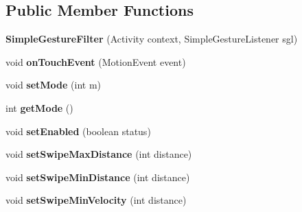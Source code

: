 \subsection*{Public Member Functions}
\begin{DoxyCompactItemize}
\item 
\hypertarget{classcom_1_1chopin_1_1SimpleGestureFilter_af3ce91f83615f801a7a5a4d4992ca9b0}{}{\bfseries Simple\+Gesture\+Filter} (Activity context, Simple\+Gesture\+Listener sgl)\label{classcom_1_1chopin_1_1SimpleGestureFilter_af3ce91f83615f801a7a5a4d4992ca9b0}

\item 
\hypertarget{classcom_1_1chopin_1_1SimpleGestureFilter_aa0f6b80bd7046a78170aa4ef7e1d6f4d}{}void {\bfseries on\+Touch\+Event} (Motion\+Event event)\label{classcom_1_1chopin_1_1SimpleGestureFilter_aa0f6b80bd7046a78170aa4ef7e1d6f4d}

\item 
\hypertarget{classcom_1_1chopin_1_1SimpleGestureFilter_a93214a56e0e5083e21374a4ea679d86a}{}void {\bfseries set\+Mode} (int m)\label{classcom_1_1chopin_1_1SimpleGestureFilter_a93214a56e0e5083e21374a4ea679d86a}

\item 
\hypertarget{classcom_1_1chopin_1_1SimpleGestureFilter_a07c13f2f34e3b08451db07b266ab2d8e}{}int {\bfseries get\+Mode} ()\label{classcom_1_1chopin_1_1SimpleGestureFilter_a07c13f2f34e3b08451db07b266ab2d8e}

\item 
\hypertarget{classcom_1_1chopin_1_1SimpleGestureFilter_ab545f0113399137a8788138603caaaa6}{}void {\bfseries set\+Enabled} (boolean status)\label{classcom_1_1chopin_1_1SimpleGestureFilter_ab545f0113399137a8788138603caaaa6}

\item 
\hypertarget{classcom_1_1chopin_1_1SimpleGestureFilter_a6aafbd67deec72e61e2cc62d34248182}{}void {\bfseries set\+Swipe\+Max\+Distance} (int distance)\label{classcom_1_1chopin_1_1SimpleGestureFilter_a6aafbd67deec72e61e2cc62d34248182}

\item 
\hypertarget{classcom_1_1chopin_1_1SimpleGestureFilter_a56e98209542bab7e32fb0e4765aab019}{}void {\bfseries set\+Swipe\+Min\+Distance} (int distance)\label{classcom_1_1chopin_1_1SimpleGestureFilter_a56e98209542bab7e32fb0e4765aab019}

\item 
\hypertarget{classcom_1_1chopin_1_1SimpleGestureFilter_a901bae4f567ddc63081aa492c1f9a977}{}void {\bfseries set\+Swipe\+Min\+Velocity} (int distance)\label{classcom_1_1chopin_1_1SimpleGestureFilter_a901bae4f567ddc63081aa492c1f9a977}


\end{DoxyCompactItemize}
